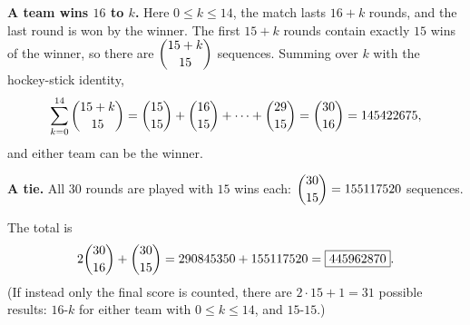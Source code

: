 \textbf{A team wins $16$ to $k$.} Here $0\le k\le14$, the match lasts $16+k$ rounds, and the last round is won by the winner. The first $15+k$ rounds contain exactly $15$ wins of the winner, so there are $\dbinom{15+k}{15}$ sequences. Summing over $k$ with the hockey-stick identity,
\[
\sum_{k=0}^{14}\dbinom{15+k}{15}=\dbinom{15}{15}+\dbinom{16}{15}+\cdots+\dbinom{29}{15}=\dbinom{30}{16}=145422675 ,
\]
and either team can be the winner.

\textbf{A tie.} All $30$ rounds are played with $15$ wins each: $\dbinom{30}{15}=155117520$ sequences.

The total is
\[
2\dbinom{30}{16}+\dbinom{30}{15}=290845350+155117520=\boxed{445962870}.
\]
(If instead only the final score is counted, there are $2\cdot15+1=31$ possible results: $16$-$k$ for either team with $0\le k\le14$, and $15$-$15$.)
